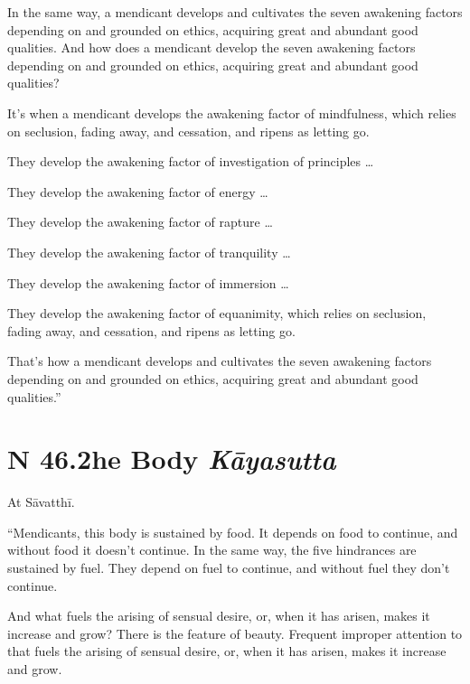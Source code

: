 \documentclass[12pt,openany]{book}%
\newcommand*{\suttatitleacronym}[1]{\smaller[2]{#1}\vspace*{.3em}}
\newcommand*{\suttatitletranslation}[1]{\linebreak{#1}}
\newcommand*{\suttatitleroot}[1]{\linebreak\smaller[2]\itshape{#1}}
\newcommand*{\tocacronym}[1]{\hspace*{-3.3em}{#1}\quad}
\newcommand*{\toctranslation}[1]{#1}
\newcommand*{\tocroot}[1]{(\textit{#1})}
\begin{document}
In the same way, a mendicant develops and cultivates the seven awakening factors depending on and grounded on ethics, acquiring great and abundant good qualities. And how does a mendicant develop the seven awakening factors depending on and grounded on ethics, acquiring great and abundant good qualities? 

It’s when a mendicant develops the awakening factor of mindfulness, which relies on seclusion, fading away, and cessation, and ripens as letting go. 

They develop the awakening factor of investigation of principles … 

They develop the awakening factor of energy … 

They develop the awakening factor of rapture … 

They develop the awakening factor of tranquility … 

They develop the awakening factor of immersion … 

They develop the awakening factor of equanimity, which relies on seclusion, fading away, and cessation, and ripens as letting go. 

That’s how a mendicant develops and cultivates the seven awakening factors depending on and grounded on ethics, acquiring great and abundant good qualities.” 

%
\section*{{\suttatitleacronym SN 46.2}{\suttatitletranslation The Body }{\suttatitleroot Kāyasutta}}
\addcontentsline{toc}{section}{\tocacronym{SN 46.2} \toctranslation{The Body } \tocroot{Kāyasutta}}

At \textsanskrit{Sāvatthī}. 

“Mendicants, this body is sustained by food. It depends on food to continue, and without food it doesn’t continue. In the same way, the five hindrances are sustained by fuel. They depend on fuel to continue, and without fuel they don’t continue. 

And what fuels the arising of sensual desire, or, when it has arisen, makes it increase and grow? There is the feature of beauty. Frequent improper attention to that fuels the arising of sensual desire, or, when it has arisen, makes it increase and grow. 
\end{document}
